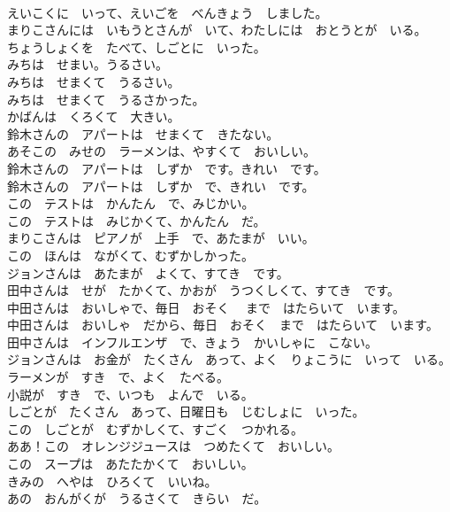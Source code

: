 \documentclass[8pt]{extreport}
\begin{document}
\begin{CJK}{UTF8}{min}
\\	えいこくに　いって、えいごを　べんきょう　しました。	
\\	まりこさんには　いもうとさんが　いて、わたしには　おとうとが　いる。	
\\	ちょうしょくを　たべて、しごとに　いった。	
\\	みちは　せまい。うるさい。	
\\	みちは　せまくて　うるさい。	
\\	みちは　せまくて　うるさかった。	
\\	かばんは　くろくて　大きい。	
\\	鈴木さんの　アパートは　せまくて　きたない。	
\\	あそこの　みせの　ラーメンは、やすくて　おいしい。	
\\	鈴木さんの　アパートは　しずか　です。きれい　です。	
\\	鈴木さんの　アパートは　しずか　で、きれい　です。	
\\	この　テストは　かんたん　で、みじかい。	
\\	この　テストは　みじかくて、かんたん　だ。	
\\	まりこさんは　ピアノが　上手　で、あたまが　いい。	
\\	この　ほんは　ながくて、むずかしかった。	
\\	ジョンさんは　あたまが　よくて、すてき　です。	
\\	田中さんは　せが　たかくて、かおが　うつくしくて、すてき　です。	
\\	中田さんは　おいしゃで、毎日　おそく 　まで　はたらいて　います。	
\\	中田さんは　おいしゃ　だから、毎日　おそく　まで　はたらいて　います。	
\\	田中さんは　インフルエンザ　で、きょう　かいしゃに　こない。	
\\	ジョンさんは　お金が　たくさん　あって、よく　りょこうに　いって　いる。	
\\	ラーメンが　すき　で、よく　たべる。	
\\	小説が　すき　で、いつも　よんで　いる。	
\\	しごとが　たくさん　あって、日曜日も　じむしょに　いった。	
\\	この　しごとが　むずかしくて、すごく　つかれる。	
\\	ああ！この　オレンジジュースは　つめたくて　おいしい。	
\\	この　スープは　あたたかくて　おいしい。	
\\	きみの　へやは　ひろくて　いいね。	
\\	あの　おんがくが　うるさくて　きらい　だ。	

\end{CJK}
\end{document}
